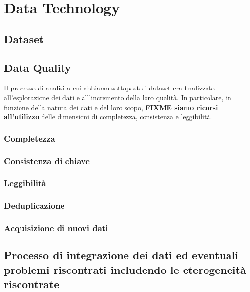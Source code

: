 \setcounter{chapter}{0}

\part{Data Technology}

\chapter{Dataset}

\chapter{Data Quality}
Il processo di analisi a cui abbiamo sottoposto i dataset era finalizzato 
all'esplorazione dei dati e all'incremento della loro qualità. In particolare, 
in funzione della natura dei dati e del loro scopo, \textbf{FIXME siamo ricorsi 
all'utilizzo} delle dimensioni di completezza, consistenza e leggibilità.


\section{Completezza}

\section{Consistenza di chiave}

\section{Leggibilità}

\section{Deduplicazione}

\section{Acquisizione di nuovi dati}

\chapter{Processo di integrazione dei dati ed eventuali problemi riscontrati includendo le eterogeneità riscontrate}

